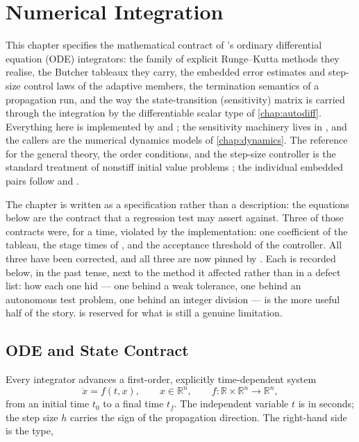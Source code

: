\chapter{Numerical Integration}
\label{chap:integration}

This chapter specifies the mathematical contract of \lupnt{}'s ordinary
differential equation (ODE) integrators: the family of explicit Runge--Kutta
methods they realise, the Butcher tableaux they carry, the embedded error
estimates and step-size control laws of the adaptive members, the termination
semantics of a propagation run, and the way the state-transition (sensitivity)
matrix is carried through the integration by the differentiable scalar type of
\cref{chap:autodiff}. Everything here is implemented by
 and
; the sensitivity machinery lives in
, and the callers are the numerical
dynamics models of \cref{chap:dynamics}. The reference for the general theory,
the order conditions, and the step-size controller is the standard treatment
of nonstiff initial value problems \citep{hairer1993}; the individual embedded
pairs follow \citep{fehlberg1969} and \citep{dormand1980}.

The chapter is written as a specification rather than a description: the
equations below are the contract that a regression test may assert against.
Three of those contracts were, for a time, violated by the implementation: one
coefficient of the  tableau, the stage times of , and the
acceptance threshold of the  controller. All three have been
corrected, and all three are now pinned by
. Each is recorded below, in
the past tense, next to the method it affected rather than in a defect list:
how each one hid --- one behind a weak tolerance, one behind an autonomous
test problem, one behind an integer division --- is the more useful half of
the story.  is reserved for what is still a genuine
limitation.

\section{ODE and State Contract}
\label{sec:int-contract}

Every integrator advances a first-order, explicitly time-dependent system
\begin{equation}
  \label{eq:int-ode}
  \dot{x} = f(t, x),
  \qquad x \in \mathbb{R}^{n},
  \qquad f : \mathbb{R}\times\mathbb{R}^{n} \to \mathbb{R}^{n},
\end{equation}
from an initial time $t_0$ to a final time $t_f$. The independent variable $t$
is in seconds; the step size $h$ carries the sign of the propagation
direction. The right-hand side is the  type,

